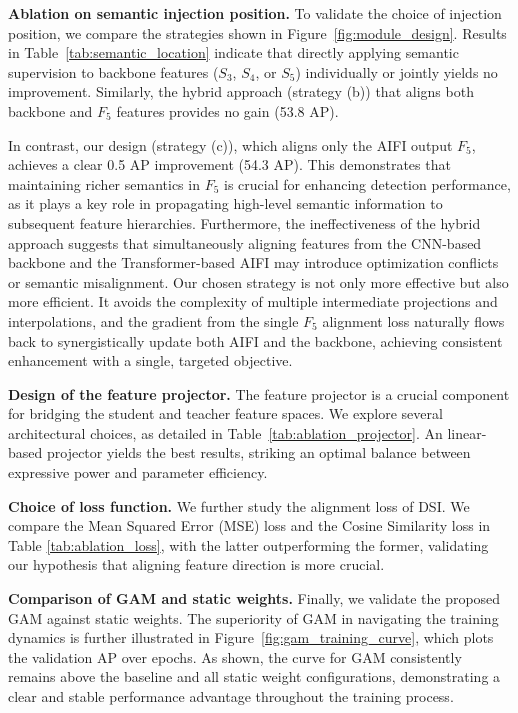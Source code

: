 

\noindent \textbf{Ablation on semantic injection position.}
To validate the choice of injection position, we compare the strategies shown in Figure~\ref{fig:module_design}. Results in Table~\ref{tab:semantic_location} indicate that directly applying semantic supervision to backbone features (\(S_3\), \(S_4\), or \(S_5\)) individually or jointly yields no improvement. Similarly, the hybrid approach (strategy (b)) that aligns both backbone and \(F_5\) features provides no gain (53.8 AP). 

In contrast, our design (strategy (c)), which aligns only the AIFI output \(F_5\), achieves a clear 0.5 AP improvement (54.3 AP). 
This demonstrates that maintaining richer semantics in \(F_5\) is crucial for enhancing detection performance, as it plays a key role in propagating high-level semantic information to subsequent feature hierarchies. Furthermore, the ineffectiveness of the hybrid approach suggests that simultaneously aligning features from the CNN-based backbone and the Transformer-based AIFI may introduce optimization conflicts or semantic misalignment. Our chosen strategy is not only more effective but also more efficient. It avoids the complexity of multiple intermediate projections and interpolations, and the gradient from the single \(F_5\) alignment loss naturally flows back to synergistically update both AIFI and the backbone, achieving consistent enhancement with a single, targeted objective.



\noindent \textbf{Design of the feature projector.}
The feature projector is a crucial component for bridging the student and teacher feature spaces. We explore several architectural choices, as detailed in Table~\ref{tab:ablation_projector}. An linear-based projector yields the best results, striking an optimal balance between expressive power and parameter efficiency. 


\noindent \textbf{Choice of loss function.}
We further study the alignment loss of DSI.
We compare the Mean Squared Error (MSE) loss and the Cosine Similarity loss in Table \ref{tab:ablation_loss}, with the latter outperforming the former, validating our hypothesis that aligning feature direction is more crucial.


\noindent \textbf{Comparison of GAM and static weights.}
Finally, we validate the proposed GAM against static weights. The superiority of GAM in navigating the training dynamics is further illustrated in Figure~\ref{fig:gam_training_curve}, which plots the validation AP over epochs. As shown, the curve for GAM consistently remains above the baseline and all static weight configurations, demonstrating a clear and stable performance advantage throughout the training process.

